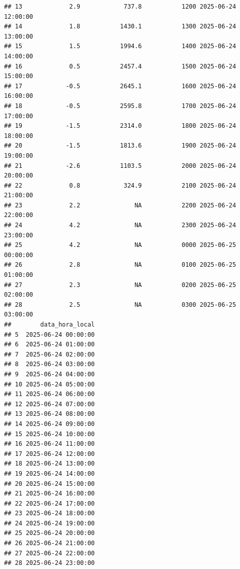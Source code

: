 \documentclass[
]{article}
\begin{document}
\begin{verbatim}
## 13             2.9            737.8           1200 2025-06-24 12:00:00
## 14             1.8           1430.1           1300 2025-06-24 13:00:00
## 15             1.5           1994.6           1400 2025-06-24 14:00:00
## 16             0.5           2457.4           1500 2025-06-24 15:00:00
## 17            -0.5           2645.1           1600 2025-06-24 16:00:00
## 18            -0.5           2595.8           1700 2025-06-24 17:00:00
## 19            -1.5           2314.0           1800 2025-06-24 18:00:00
## 20            -1.5           1813.6           1900 2025-06-24 19:00:00
## 21            -2.6           1103.5           2000 2025-06-24 20:00:00
## 22             0.8            324.9           2100 2025-06-24 21:00:00
## 23             2.2               NA           2200 2025-06-24 22:00:00
## 24             4.2               NA           2300 2025-06-24 23:00:00
## 25             4.2               NA           0000 2025-06-25 00:00:00
## 26             2.8               NA           0100 2025-06-25 01:00:00
## 27             2.3               NA           0200 2025-06-25 02:00:00
## 28             2.5               NA           0300 2025-06-25 03:00:00
##        data_hora_local
## 5  2025-06-24 00:00:00
## 6  2025-06-24 01:00:00
## 7  2025-06-24 02:00:00
## 8  2025-06-24 03:00:00
## 9  2025-06-24 04:00:00
## 10 2025-06-24 05:00:00
## 11 2025-06-24 06:00:00
## 12 2025-06-24 07:00:00
## 13 2025-06-24 08:00:00
## 14 2025-06-24 09:00:00
## 15 2025-06-24 10:00:00
## 16 2025-06-24 11:00:00
## 17 2025-06-24 12:00:00
## 18 2025-06-24 13:00:00
## 19 2025-06-24 14:00:00
## 20 2025-06-24 15:00:00
## 21 2025-06-24 16:00:00
## 22 2025-06-24 17:00:00
## 23 2025-06-24 18:00:00
## 24 2025-06-24 19:00:00
## 25 2025-06-24 20:00:00
## 26 2025-06-24 21:00:00
## 27 2025-06-24 22:00:00
## 28 2025-06-24 23:00:00
\end{verbatim}
\end{document}
